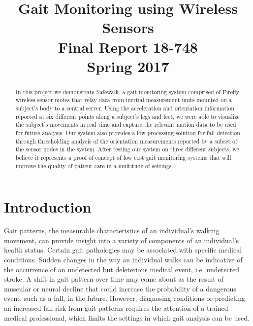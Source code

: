 \documentclass[conference]{IEEEtran}
\author{
  \IEEEauthorblockN{
   Iljoo Baek, Mengwen He and Emily Ruppel
  }
 \IEEEauthorblockA{
   Carnegie Mellon University
  }
 \IEEEauthorblockA{
   {ibaek,mengwenhe,eruppel}@andrew.cmu.edu
  }
}
\title{Gait Monitoring using Wireless Sensors\\
        \vspace{4mm}
        \large{Final Report 18-748}\\
        \large{Spring 2017}}
\newcommand{\sys}{Safewalk\xspace}
\begin{document}
\maketitle
\thispagestyle{plain}
\pagestyle{plain}

\begin{abstract}
In this project we demonstrate \sys, a gait monitoring system comprised of Firefly wireless
sensor motes that relay data from inertial measurement units mounted on a subject's body
to a central server. Using the acceleration and orientation information reported at six
different points along a subject's legs and feet, we were able to visualize the subject's
movements in real time and capture the relevant motion data to be used for future
analysis. Our system also provides a low-processing solution for fall detection through
thresholding analysis of the orientation measurements reported by a subset of the sensor
nodes in the system. After testing our system on three different subjects, we believe it
represents a proof of concept of low cost gait monitoring systems that will improve the
quality of patient care in a multitude of settings. 
\end{abstract}

\section{Introduction}
  \label{sec:intro}
  Gait patterns, the measurable characteristics of an individual’s walking movement, can
provide insight into a variety of components of an individual’s health status. Certain
gait pathologies may be associated with specific medical conditions. Sudden changes in the
way an individual walks can be indicative of the occurrence of an undetected but
deleterious medical event, i.e. undetected stroke. A shift in gait pattern over time may
come about as the result of muscular or neural decline that could increase the probability
of a dangerous event, such as a fall, in the future. However, diagnosing conditions or
predicting an increased fall risk from gait patterns requires the attention of a trained
medical professional, which limits the settings in which gait analysis can be used.
    
\end{document}
